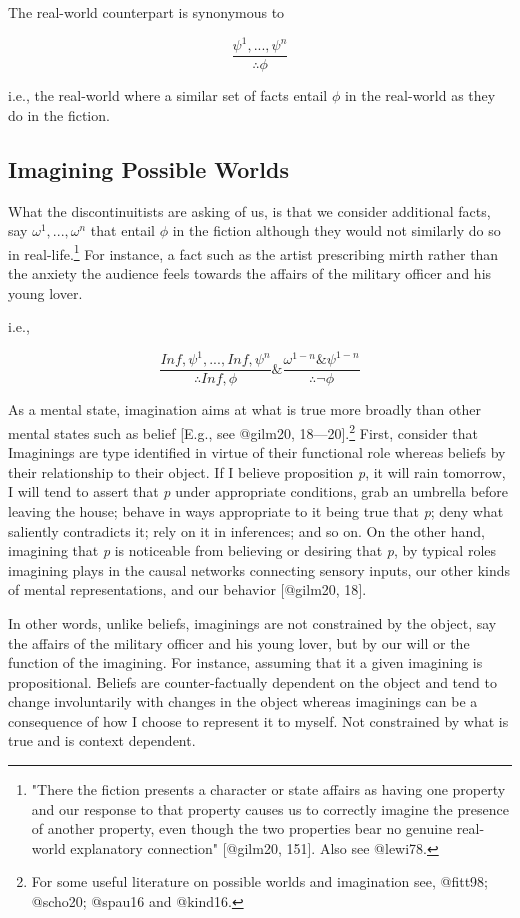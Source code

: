 \documentclass[
  letterpaper,
  DIV=11,
  numbers=noendperiod]{scrartcl}
\theoremstyle{remark}
\begin{document}
\noindent The real-world counterpart is synonymous to

\[\frac{\psi^{1}, . . ., \psi^{n}}{\therefore\phi}\]

\noindent i.e., the real-world where a similar set of facts entail
\(\phi\) in the real-world as they do in the fiction.

\subsection{Imagining Possible Worlds}\label{imagining-possible-worlds}

What the discontinuitists are asking of us, is that we consider
additional facts, say \(\omega^{1}, . . ., \omega^{n}\) that entail
\(\phi\) in the fiction although they would not similarly do so in
real-life.\footnote{"There the fiction presents a character or state
  affairs as having one property and our response to that property
  causes us to correctly imagine the presence of another property, even
  though the two properties bear no genuine real-world explanatory
  connection" {[}@gilm20, 151{]}. Also see @lewi78.} For instance, a
fact such as the artist prescribing mirth rather than the anxiety the
audience feels towards the affairs of the military officer and his young
lover.

\noindent i.e.,

\[\frac{In f, \psi^{1}, . . ., In f, \psi^{n}}{\therefore In f, \phi} \& \frac{\omega^{1-n} \& \psi^{1-n}}{\therefore\neg\phi}\]

As a mental state, imagination aims at what is true more broadly than
other mental states such as belief {[}E.g., see @gilm20,
18---20{]}.\footnote{For some useful literature on possible worlds and
  imagination see, @fitt98; @scho20; @spau16 and @kind16.} First,
consider that Imaginings are type identified in virtue of their
functional role whereas beliefs by their relationship to their object.
If I believe proposition \emph{p}, it will rain tomorrow, I will tend to
assert that \emph{p} under appropriate conditions, grab an umbrella
before leaving the house; behave in ways appropriate to it being true
that \emph{p}; deny what saliently contradicts it; rely on it in
inferences; and so on. On the other hand, imagining that \emph{p} is
noticeable from believing or desiring that \emph{p}, by typical roles
imagining plays in the causal networks connecting sensory inputs, our
other kinds of mental representations, and our behavior {[}@gilm20,
18{]}.

In other words, unlike beliefs, imaginings are not constrained by the
object, say the affairs of the military officer and his young lover, but
by our will or the function of the imagining. For instance, assuming
that it a given imagining is propositional. Beliefs are
counter-factually dependent on the object and tend to change
involuntarily with changes in the object whereas imaginings can be a
consequence of how I choose to represent it to myself. Not constrained
by what is true and is context dependent.
\end{document}
